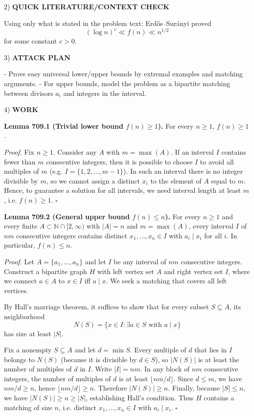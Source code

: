 2) \textbf{QUICK LITERATURE/CONTEXT CHECK}

Using only what is stated in the problem text: Erd\H{o}s--Sur\'anyi proved
\[(\log n)^c \ll f(n) \ll n^{1/2}\]
for some constant $c>0$.

3) \textbf{ATTACK PLAN}

- Prove easy universal lower/upper bounds by extremal examples and matching arguments.
- For upper bounds, model the problem as a bipartite matching between divisors $a_i$ and integers in the interval.

4) \textbf{WORK}

\textbf{Lemma 709.1 (Trivial lower bound $f(n)\ge 1$).}
For every $n\ge 1$, $f(n)\ge 1$.

\textit{Proof.}
Fix $n\ge 1$. Consider any $A$ with $m=\max(A)$.
If an interval $I$ contains fewer than $m$ consecutive integers, then it is possible to choose $I$ to avoid all multiples of $m$ (e.g. $I=\{1,2,\dots,m-1\}$).
In such an interval there is no integer divisible by $m$, so we cannot assign a distinct $x_i$ to the element of $A$ equal to $m$.
Hence, to guarantee a solution for all intervals, we need interval length at least $m$, i.e. $f(n)\ge 1$.
\hfill$\square$

\textbf{Lemma 709.2 (General upper bound $f(n)\le n$).}
For every $n\ge 1$ and every finite $A\subset\mathbb{N}\cap[2,\infty)$ with $|A|=n$ and $m=\max(A)$, every interval $I$ of $nm$ consecutive integers contains distinct $x_1,\dots,x_n\in I$ with $a_i\mid x_i$ for all $i$.
In particular, $f(n)\le n$.

\textit{Proof.}
Let $A=\{a_1,\dots,a_n\}$ and let $I$ be any interval of $nm$ consecutive integers.
Construct a bipartite graph $H$ with left vertex set $A$ and right vertex set $I$, where we connect $a\in A$ to $x\in I$ iff $a\mid x$.
We seek a matching that covers all left vertices.

By Hall's marriage theorem, it suffices to show that for every subset $S\subseteq A$, its neighborhood
\[
N(S)=\{x\in I:\exists a\in S\text{ with }a\mid x\}
\]
has size at least $|S|$.

Fix a nonempty $S\subseteq A$ and let $d=\min S$.
Every multiple of $d$ that lies in $I$ belongs to $N(S)$ (because it is divisible by $d\in S$), so $|N(S)|$ is at least the number of multiples of $d$ in $I$.
Write $|I|=nm$.
In any block of $nm$ consecutive integers, the number of multiples of $d$ is at least $\lfloor nm/d\rfloor$.
Since $d\le m$, we have $nm/d\ge n$, hence $\lfloor nm/d\rfloor\ge n$.
Therefore $|N(S)|\ge n$.
Finally, because $|S|\le n$, we have $|N(S)|\ge n\ge |S|$, establishing Hall's condition.
Thus $H$ contains a matching of size $n$, i.e. distinct $x_1,\dots,x_n\in I$ with $a_i\mid x_i$.
\hfill$\square$

